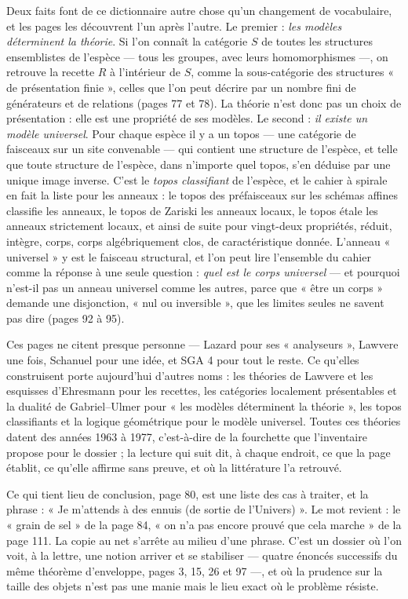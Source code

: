 \documentclass[11pt,a4paper]{article}
\begin{document}
\begin{resume}
Deux faits font de ce dictionnaire autre chose qu'un changement de
vocabulaire, et les pages les découvrent l'un après l'autre. Le premier :
\emph{les modèles déterminent la théorie}. Si l'on connaît la catégorie $S$
de toutes les structures ensemblistes de l'espèce — tous les groupes, avec
leurs homomorphismes —, on retrouve la recette $R$ à l'intérieur de $S$,
comme la sous-catégorie des structures « de présentation finie », celles
que l'on peut décrire par un nombre fini de générateurs et de relations
(pages 77 et 78). La théorie n'est donc pas un choix de présentation : elle
est une propriété de ses modèles. Le second : \emph{il existe un modèle
universel}. Pour chaque espèce il y a un topos — une catégorie de faisceaux
sur un site convenable — qui contient une structure de l'espèce, et telle
que toute structure de l'espèce, dans n'importe quel topos, s'en déduise par
une unique image inverse. C'est le \emph{topos classifiant} de l'espèce, et
le cahier à spirale en fait la liste pour les anneaux : le topos des
préfaisceaux sur les schémas affines classifie les anneaux, le topos de
Zariski les anneaux locaux, le topos étale les anneaux strictement
locaux, et ainsi de suite pour vingt-deux propriétés, réduit, intègre,
corps, corps algébriquement clos, de caractéristique donnée. L'anneau
« universel » y est le faisceau structural, et l'on peut lire l'ensemble du
cahier comme la réponse à une seule question : \emph{quel est le corps
universel} — et pourquoi n'est-il pas un anneau universel comme les
autres, parce que « être un corps » demande une disjonction, « nul ou
inversible », que les limites seules ne savent pas dire (pages 92 à 95).

Ces pages ne citent presque personne — Lazard pour ses « analyseurs »,
Lawvere une fois, Schanuel pour une idée, et SGA 4 pour tout le reste. Ce
qu'elles construisent porte aujourd'hui d'autres noms : les théories de
Lawvere et les esquisses d'Ehresmann pour les recettes, les catégories
localement présentables et la dualité de Gabriel--Ulmer pour « les modèles
déterminent la théorie », les topos classifiants et la logique géométrique
pour le modèle universel. Toutes ces théories datent des années 1963 à
1977, c'est-à-dire de la fourchette que l'inventaire propose pour le
dossier ; la lecture qui suit dit, à chaque endroit, ce que la page
établit, ce qu'elle affirme sans preuve, et où la littérature l'a
retrouvé.

Ce qui tient lieu de conclusion, page 80, est une liste des cas à traiter,
et la phrase : « Je m'attends à des ennuis (de sortie de l'Univers) ». Le
mot revient : le « grain de sel » de la page 84, « on n'a pas encore prouvé
que cela marche » de la page 111. La copie au net s'arrête au milieu d'une
phrase. C'est un dossier où l'on voit, à la lettre, une notion arriver et
se stabiliser — quatre énoncés successifs du même théorème d'enveloppe,
pages 3, 15, 26 et 97 —, et où la prudence sur la taille des objets n'est
pas une manie mais le lieu exact où le problème résiste.


\end{resume}
\end{document}

